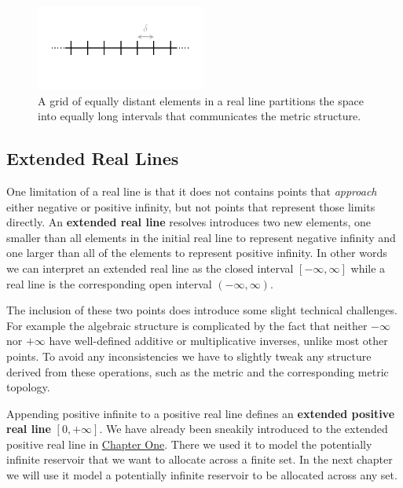 \documentclass[
  letterpaper,
  DIV=11,
  numbers=noendperiod]{scrartcl}
\begin{document}
\begin{figure}

{\centering \includegraphics[width=0.5\textwidth,height=\textheight]{figures/real_line_grid/real_line_grid.pdf}

}

\caption{\label{fig-real-line-grid}A grid of equally distant elements in
a real line partitions the space into equally long intervals that
communicates the metric structure.}

\end{figure}

\hypertarget{extended-real-lines}{%
\subsection{Extended Real Lines}\label{extended-real-lines}}

One limitation of a real line is that it does not contains points that
\emph{approach} either negative or positive infinity, but not points
that represent those limits directly. An \textbf{extended real line}
resolves introduces two new elements, one smaller than all elements in
the initial real line to represent negative infinity and one larger than
all of the elements to represent positive infinity. In other words we
can interpret an extended real line as the closed interval
\([-\infty, \infty]\) while a real line is the corresponding open
interval \((-\infty, \infty)\).

The inclusion of these two points does introduce some slight technical
challenges. For example the algebraic structure is complicated by the
fact that neither \(-\infty\) nor \(+\infty\) have well-defined additive
or multiplicative inverses, unlike most other points. To avoid any
inconsistencies we have to slightly tweak any structure derived from
these operations, such as the metric and the corresponding metric
topology.

Appending positive infinite to a positive real line defines an
\textbf{extended positive real line} \([0, +\infty]\). We have already
been sneakily introduced to the extended positive real line in
\href{https://betanalpha.github.io/assets/chapters_html/probability_on_finite_spaces.html}{Chapter
One}. There we used it to model the potentially infinite reservoir that
we want to allocate across a finite set. In the next chapter we will use
it model a potentially infinite reservoir to be allocated across any
set.
\end{document}
